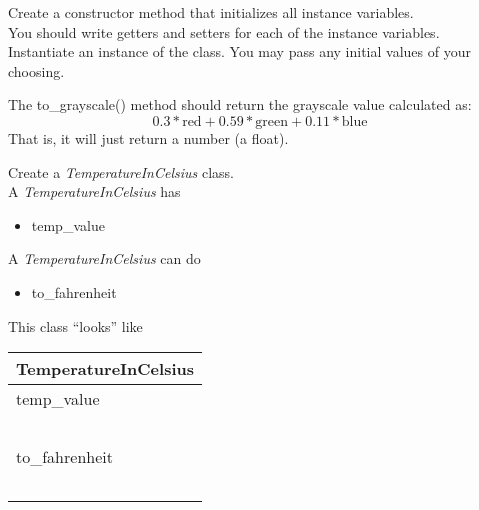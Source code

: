 \documentclass{article}
\newcommand{\tab}{\hspace*{0.25in}}
\begin{document}
\begin{enumerate}
	\vspace*{2ex}
	Create a constructor method that initializes all instance variables.\\
	You should write getters and setters for each of the instance variables.\\
	Instantiate an instance of the class. You may pass any initial values of your choosing.

	The to\_grayscale() method should return the grayscale value calculated as: 
		$$0.3 * \text{red} + 0.59 * \text{green} + 0.11 * \text{blue}$$
	That is, it will just return a number (a float).




	\begin{minipage}{.6\textwidth}
		\item Create a \textit{TemperatureInCelsius} class.\\
		
		A \textit{TemperatureInCelsius} has
		\begin{itemize}
			\item temp\_value
		\end{itemize}

		A \textit{TemperatureInCelsius} can do
		\begin{itemize}
			\item to\_fahrenheit
		\end{itemize}
	\end{minipage}
	\begin{minipage}{.4\textwidth}
		This class ``looks'' like 
				
		\vspace*{1em}
		\begin{tabular}{|l|}
			\hline TemperatureInCelsius\\ \hline
			temp\_value\\ \ \\  \hline
			to\_fahrenheit\\ \ \\ \hline
		\end{tabular}
	\end{minipage}




\end{enumerate}
\end{document}

